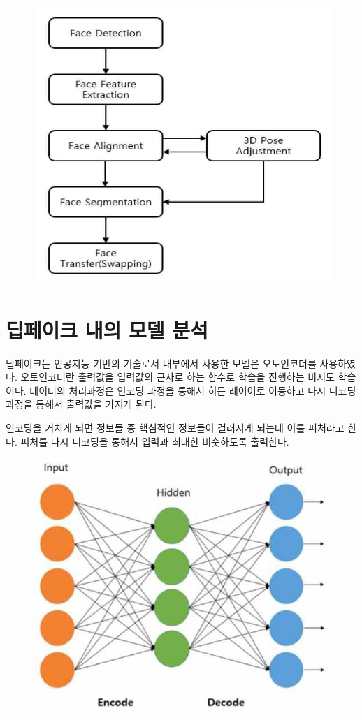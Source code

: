 \documentclass{oblivoir}
\begin{document}
\begin{figure}[h!]
\centering
\includegraphics{pic/chp4/img798}
\end{figure}


\section{ 딥페이크 내의 모델 분석}

딥페이크는 인공지능 기반의 기술로서 내부에서 사용한 모델은 오토인코더를 사용하였다. 오토인코더란 출력값을 입력값의 근사로 하는 함수로 학습을 진행하는 비지도 학습이다. 데이터의 처리과정은 인코딩 과정을 통해서 히든 레이어로 이동하고 다시 디코딩 과정을 통해서 출력값을 가지게 된다.

인코딩을 거치게 되면 정보들 중 핵심적인 정보들이 걸러지게 되는데 이를 피처라고 한다. 피처를 다시 디코딩을 통해서 입력과 최대한 비슷하도록 출력한다.

\begin{figure}[h!]
\centering
\includegraphics{pic/chp4/img802}

\end{figure}
\end{document}
